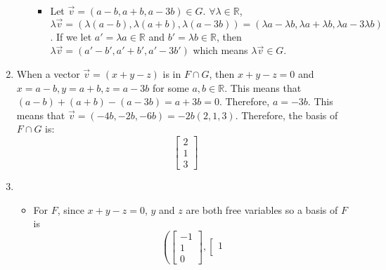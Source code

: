 \documentclass[12pt]{article}
\begin{document}
\begin{enumerate}[label=(\alph*)]
\begin{itemize}
\begin{itemize}
                                \item Let $\vec{v} = (a - b, a + b, a - 3b)\in G$. $\forall \lambda \in \mathbb{R}$, $\lambda \vec{v} = (\lambda(a-b), \lambda(a+b), \lambda(a-3b))=(\lambda a - \lambda b, \lambda a + \lambda b, \lambda a - 3\lambda b)$. If we let $a' = \lambda a \in \mathbb{R}$ and $b' = \lambda b \in \mathbb{R}$, then $\lambda \vec{v} = (a' - b', a' + b', a' - 3b')$ which means $\lambda \vec{v} \in G$.
                            \end{itemize}
                    \end{itemize}
                \item When a vector $\vec{v} = (x + y - z)$ is in $F\cap G$, then $x+y-z=0$ and $x=a-b, y=a+b, z=a-3b$ for some $a,b \in \mathbb{R}$. This means that $(a-b) + (a+b) - (a-3b)=a+3b=0$. Therefore, $a=-3b$. This means that $\vec{v} = (-4b, -2b, -6b) = -2b(2, 1, 3)$. Therefore, the basis of $F\cap G$ is:
                    \begin{equation*}
                        \left[\begin{matrix}
                            2\\
                            1\\
                            3
                        \end{matrix}\right]
                    \end{equation*}
                \item 
                    \begin{itemize}
                        \item For $F$, since $x + y - z = 0$, $y$ and $z$ are both free variables so a basis of $F$ is
                            \begin{equation*}
                                \left(
                                    \left[
                                        \begin{matrix}
                                            -1\\
                                            1\\
                                            0
                                        \end{matrix}
                                    \right],
                                    \left[
                                        \begin{matrix}
                                            1\\

\end{matrix}
\end{equation*}
\end{itemize}
\end{enumerate}
\end{document}

